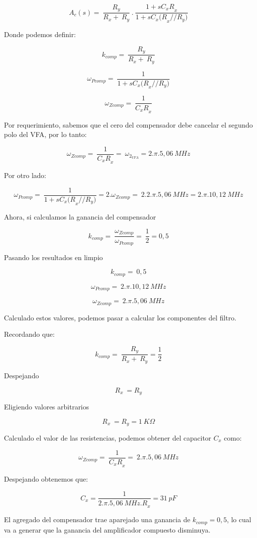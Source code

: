 \documentclass[12pt,a4paper]{article}
\begin{document}
\[A_{c}(s) = \ \frac{R_{y}}{R_{x} + \ R_{y}}\ .\ \frac{1 + {sC_{x}R}_{x}}{1 + {sC_{x}(R}_{x}//R_{y})}\]

Donde podemos definir:

\[k_{comp} = \ \frac{R_{y}}{R_{x} + \ R_{y}}\]

\[\omega_{Pcomp} = \ \frac{1}{1 + {sC_{x}(R}_{x}//R_{y})}\]

\[\omega_{Zcomp} = \ \frac{1}{{C_{x}R}_{x}}\]

Por requerimiento, sabemos que el cero del compensador debe cancelar el
segundo polo del VFA, por lo tanto:

\[\omega_{Zcomp} = \ \frac{1}{{C_{x}R}_{x}} = \ \omega_{2_{VFA}} = 2.\pi.5,06\ MHz\]

Por otro lado:

\[\omega_{Pcomp} = \ \frac{1}{1 + {sC_{x}(R}_{x}//R_{y})} = 2.\omega_{Zcomp} = \ 2.2.\pi.5,06\ MHz = 2.\pi.10,12\ MHz\]

Ahora, si calculamos la ganancia del compensador

\[k_{comp} = \ \frac{\omega_{Zcomp}}{\omega_{Pcomp}} = \ \frac{1}{2} = 0,5\]

Pasando los resultados en limpio

\[k_{comp} = \ 0,5\]

\[\omega_{Pcomp} = \ 2.\pi.10,12\ MHz\]

\[\omega_{Zcomp} = \ 2.\pi.5,06\ MHz\]

Calculado estos valores, podemos pasar a calcular los componentes del
filtro.

Recordando que:

\[k_{comp} = \ \frac{R_{y}}{R_{x} + \ R_{y}} = \frac{1}{2}\]

Despejando

\[R_{x}\  = R_{y}\]

Eligiendo valores arbitrarios

\[R_{x}\  = R_{y} = 1\ K\Omega\]

Calculado el valor de las resistencias, podemos obtener del capacitor
\(C_{x}\) como:

\[\omega_{Zcomp} = \ \frac{1}{{C_{x}R}_{x}} = \ 2.\pi.5,06\ MHz\]

Despejando obtenemos que:

\[C_{x} = \frac{1}{{2.\pi.5,06\ MHz.R}_{x}} = 31\ pF\]

El agregado del compensador trae aparejado una ganancia de
\(k_{comp} = 0,5\), lo cual va a generar que la ganancia del
amplificador compuesto disminuya.
\end{document}
